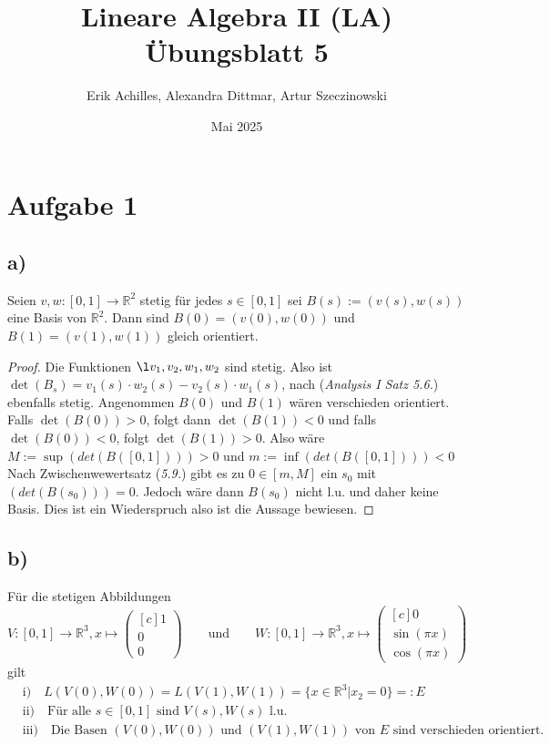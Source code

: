 \documentclass{article}
\title{Lineare Algebra II (LA) Übungsblatt 5}
\author{Erik Achilles, Alexandra Dittmar, Artur Szeczinowski}
\date{Mai 2025}
\newcommand{\RR}{\mathbb{R}}
\newcommand{\vect}[1]{\begin{pmatrix*}[c] #1 \end{pmatrix*}}
\begin{document}
\section*{Aufgabe 1}

\subsection*{a)}
Seien $v,w : [0, 1] \to \RR^2$ stetig für jedes
$s \in [0,1]$ sei $B(s) := (v(s), w(s))$ eine Basis
von $\RR^2$. Dann sind $B(0) = (v(0), w(0))$ und
$B(1) = (v(1), w(1))$ gleich orientiert.

\begin{proof}
  Die Funktionen $\l v_1, v_2, w_1, w_2$ sind stetig.
  Also ist $\det(B_s) = v_1(s) \cdot w_2(s)
    - v_2(s) \cdot w_1(s)$, nach (\textit{Analysis I Satz 5.6.})
  ebenfalls stetig.
  Angenommen $B(0)$ und $B(1)$ wären verschieden orientiert.
  Falls $\det(B(0)) > 0$, folgt dann $\det(B(1)) < 0$ und
  falls $\det(B(0)) < 0$, folgt $\det(B(1)) > 0$.
  Also wäre $M := \sup(det(B([0,1]))) > 0$ und
  $m :=\inf(det(B([0,1]))) < 0$
  Nach Zwischenwewertsatz (\textit{5.9.}) gibt es zu
  $0 \in [m,M]$ ein $s_0$ mit $(det(B(s_0))) = 0$.
  Jedoch wäre dann $B(s_0)$ nicht l.u. und daher keine Basis.
  Dies ist ein Wiederspruch also ist die Aussage bewiesen.
\end{proof}



\subsection*{b)}
Für die stetigen Abbildungen
$$
  V: [0,1] \to \RR^3, x \mapsto \vect{1 \\ 0 \\ 0}
  \qquad\text{und}\qquad
  W: [0,1] \to \RR^3, x \mapsto \vect{0 \\ \sin(\pi x) \\ \cos(\pi x)}
$$
gilt
\begin{align*}
   & \text{i)} \quad L(V(0), W(0)) = L(V (1), W(1)) = \{ x \in \RR^3 | x_2 = 0 \} =: E                       \\
   & \text{ii)} \quad \text{Für alle $s \in [0,1]$ sind $V(s),W(s)$ l.u.}                                    \\
   & \text{iii)} \quad \text{Die Basen $(V(0),W(0))$ und $(V(1),W(1))$ von $E$ sind verschieden orientiert.}
\end{align*}
\end{document}
